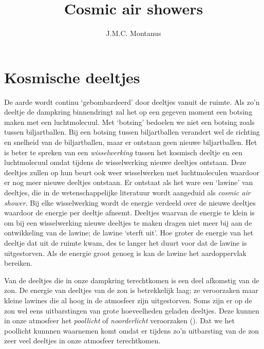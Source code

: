 

\title{Cosmic air showers}
\author{J.M.C. Montanus}



\maketitle

\section{Kosmische deeltjes}

De aarde wordt continu `gebombardeerd' door deeltjes vanuit de ruimte.
Als zo'n deeltje de dampkring binnendringt zal het op een gegeven moment
een botsing maken met een luchtmolecuul. Met `botsing' bedoelen we niet
een botsing zoals tussen biljartballen. Bij een botsing tussen
biljartballen verandert wel de richting en snelheid van de
biljartballen, maar er ontstaan geen nieuwe biljartballen. Het is beter
te spreken van een \emph{wisselwerking} tussen het kosmisch deeltje en
een luchtmolecuul omdat tijdens de wisselwerking nieuwe deeltjes
ontstaan. Deze deeltjes zullen op hun beurt ook weer wisselwerken met
luchtmoleculen waardoor er nog meer nieuwe deeltjes ontstaan. Er
ontstaat als het ware een `lawine' van deeltjes, die in de
wetenschappelijke literatuur wordt aangeduid als \emph{cosmic air
shower}. Bij elke wisselwerking wordt de energie verdeeld over de nieuwe
deeltjes waardoor de energie per deeltje afneemt. Deeltjes waarvan de
energie te klein is om bij een wisselwerking nieuwe deeltjes te maken
dragen niet meer bij aan de ontwikkeling van de lawine; de lawine
`sterft uit'. Hoe groter de energie van het deeltje dat uit de ruimte
kwam, des te langer het duurt voor dat de lawine is uitgestorven. Als de
energie groot genoeg is kan de lawine het aardoppervlak bereiken.

Van de deeltjes die in onze dampkring terechtkomen is een deel afkomstig
van de zon. De energie van deeltjes van de zon is betrekkelijk laag; ze
veroorzaken maar kleine lawines die al hoog in de atmosfeer zijn
uitgestorven. Soms zijn er op de zon wel eens uitbarstingen van grote
hoeveelheden geladen deeltjes. Deze kunnen in onze atmosfeer het
\emph{poollicht} of \emph{noorderlicht} veroorzaken
(). Dat we het poollicht kunnnen waarnemen komt
omdat er tijdens zo'n uitbarsting van de zon zeer veel deeltjes in onze
atmosfeer terechtkomen.

